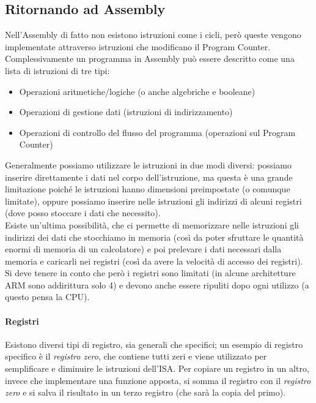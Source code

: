 \documentclass[class=book, crop=false]{standalone}
\begin{document}
\subsection{Ritornando ad Assembly}
Nell’Assembly di fatto non esistono istruzioni come i cicli, però queste vengono implementate attraverso istruzioni che modificano il Program Counter.
Complessivamente un programma in Assembly può essere descritto come una lista di istruzioni di tre tipi:
\begin{itemize}[noitemsep]
	\item Operazioni aritmetiche/logiche (o anche algebriche e booleane)
	\item Operazioni di gestione dati (istruzioni di indirizzamento)
	\item Operazioni di controllo del flusso del programma (operazioni sul Program Counter)
\end{itemize}
Generalmente possiamo utilizzare le istruzioni in due modi diversi: possiamo inserire direttamente i dati nel corpo dell'istruzione, ma questa è una grande limitazione poiché le istruzioni hanno dimensioni preimpostate (o comunque limitate), oppure possiamo inserire nelle istruzioni gli indirizzi di alcuni registri (dove posso stoccare i dati che necessito).\\
Esiste un'ultima possibilità, che ci permette di memorizzare nelle istruzioni gli indirizzi dei dati che stocchiamo in memoria (così da poter sfruttare le quantità enormi di memoria di un calcolatore) e poi prelevare i dati necessari dalla memoria e caricarli nei registri (così da avere la velocità di accesso dei registri).\\
Si deve tenere in conto che però i registri sono limitati (in alcune architetture ARM sono addirittura solo 4) e devono anche essere ripuliti dopo ogni utilizzo (a questo pensa la CPU).
\paragraph*{Registri}
Esistono diversi tipi di registro, sia generali che specifici; un esempio di registro specifico è il \emph{registro zero}, che contiene tutti zeri e viene utilizzato per semplificare e diminuire le istruzioni dell’ISA. Per copiare un registro in un altro, invece che implementare una funzione apposta, si somma il registro con il \emph{registro zero} e si salva il risultato in un terzo registro (che sarà la copia del primo).
\end{document}
